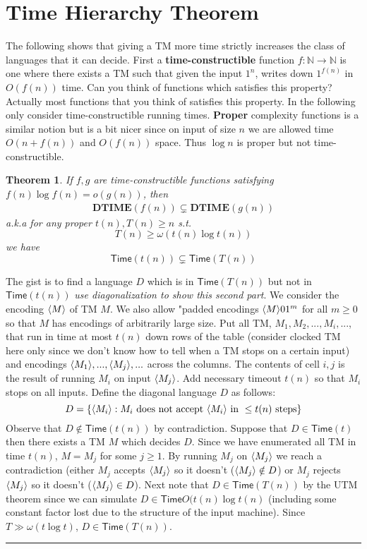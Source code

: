 \documentclass[twoside]{article}
\newcounter{lecnum}
\newtheorem{theorem}{Theorem}[lecnum]
\newenvironment{proof}{{\bf Proof:}}{\hfill\rule{2mm}{2mm}}
\def\N{\mathbb{N}}
\def\Time{\mathsf{Time}}
\DeclarePairedDelimiter\anglebrac{\langle}{\rangle}
\begin{document}
\section{Time Hierarchy Theorem}
The following shows that giving a TM more time strictly increases the class of languages that it can decide. First a \textbf{time-constructible} function $f: \N \rightarrow \N$ is one where there exists a TM such that given the input $1^n$, writes down $1^{f(n)}$ in $O(f(n))$ time. Can you think of functions which satisfies this property? Actually most functions that you think of satisfies this property. In the following only consider time-constructible running times. \textbf{Proper} complexity functions is a similar notion but is a bit nicer since on input of size $n$ we are allowed time $O(n + f(n))$ and $O(f(n))$ space. Thus $\log n$ is proper but not time-constructible. 

\begin{theorem}
If $f, g$ are time-constructible functions satisfying $f(n)\log f(n) = o(g(n))$, then 
\begin{align}
\mathbf{DTIME}(f(n)) \subsetneq \mathbf{DTIME}(g(n)) \label{DistinguishDTime}
\end{align}
a.k.a for any proper $t(n), T(n) \geq n$ s.t. 
\[T(n) \geq \omega(t(n) \log t(n))\]
we have 
\[\mathsf{Time}(t(n)) \subsetneq \mathsf{Time}(T(n))\]
\end{theorem}
\begin{proof}
The gist is to find a language $D$ which is in $\Time (T(n))$ but not in $\Time (t(n))$ \emph{use diagonalization to show this second part}. We consider the encoding $\anglebrac{M}$ of TM $M$. We also allow "padded encodings $\anglebrac{M}01^m$ for all $m \geq 0$ so that $M$ has encodings of arbitrarily large size. Put all TM, $M_1, M_2, ..., M_i, ...$, that run in time at most $t(n)$ down rows of the table (consider clocked TM here only since we don't know how to tell when a TM stops on a certain input) and encodings $\anglebrac{M_1}, ..., \anglebrac{M_j}, ...$ across the columns. The contents of cell $i, j$ is the result of running $M_i$ on input $\anglebrac{M_j}$. Add necessary timeout $t(n)$ so that $M_i$ stops on all inputs. Define the diagonal language $D$ as follows: 
\[D = \{\anglebrac{M_i}: M_i \mbox{ does not accept } \anglebrac{M_i} \mbox{ in } \leq t(n) \mbox{ steps}\}\]
Observe that $D \notin \Time (t(n))$ by contradiction. Suppose that $D \in \mathsf{Time}(t)$ then there exists a TM $M$ which decides $D$. Since we have enumerated all TM in time $t(n)$, $M = M_j$ for some $j \geq 1$. By running $M_j$ on $\anglebrac{M_j}$ we reach a contradiction (either $M_j$ accepts $\anglebrac{M_j}$ so it doesn't ($\anglebrac{M_j} \notin D$) or $M_j$ rejects $\anglebrac{M_j}$ so it doesn't ($\anglebrac{M_j} \in D$).  Next note that $D \in \Time (T(n))$ by the UTM theorem since we can simulate $D \in \Time O(t(n)\log t(n)$ (including some constant factor lost due to the structure of the input machine). Since $T \gg \omega(t \log t)$, $D \in \Time(T(n))$.   
\end{proof}
\end{document}
